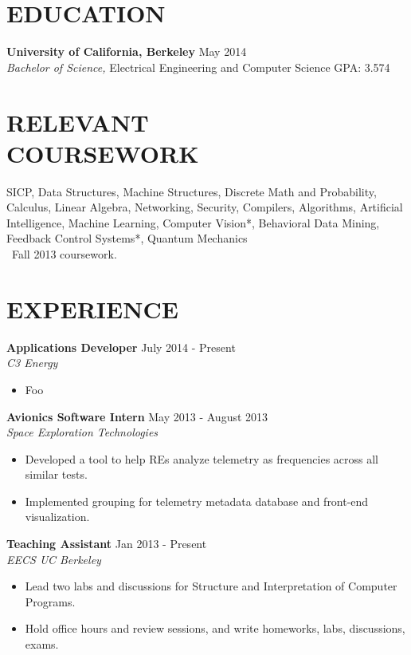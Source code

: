 \documentclass[line,margin]{res}
\begin{document}
\address{673 Brannan Street Unit 315, San Francisco CA 94107}
\address{(973) 647-5056 $|$ richard.hwang201@gmail.com}

\begin{resume}
\section{EDUCATION}
{\bf University of California, Berkeley} \hfill {\small May 2014}\\
{\sl Bachelor of Science,} Electrical Engineering and Computer Science \hfill GPA: 3.574

\section{RELEVANT \\ COURSEWORK}
SICP, Data Structures, Machine Structures, Discrete Math and Probability,
Calculus, Linear Algebra, Networking, Security, Compilers, Algorithms,
Artificial Intelligence, Machine Learning, Computer Vision*, Behavioral Data Mining,
Feedback Control Systems*, Quantum Mechanics \\
{\small \textasteriskcentered \  Fall 2013 coursework.}

\section{EXPERIENCE}
{\bf Applications Developer} \hfill {\small July 2014 - Present} \\
{\it C3 Energy}
\begin{itemize} \itemsep -1pt
  \item Foo 
\end{itemize}

{\bf Avionics Software Intern} \hfill {\small May 2013 - August 2013} \\
{\it Space Exploration Technologies}
\begin{itemize} \itemsep -1pt
  \item Developed a tool to help REs analyze telemetry as frequencies across all
      similar tests.
  \item Implemented grouping for telemetry metadata database and front-end visualization.
\end{itemize}

{\bf Teaching Assistant} \hfill {\small Jan 2013 - Present} \\
{\it EECS UC Berkeley}
\begin{itemize}  \itemsep -1pt
  \item Lead two labs and discussions for Structure and Interpretation
      of Computer Programs.
  \item Hold office hours and review sessions, and write homeworks, labs,
      discussions, exams.
\end{itemize}


\end{resume}
\end{document}
